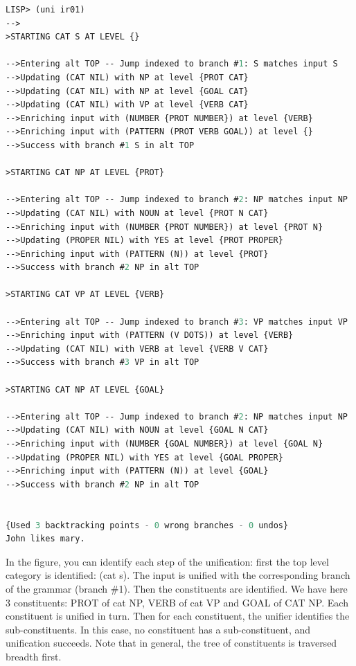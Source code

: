 \documentclass[10pt,a4paper]{report}
\begin{document}
\begin{lstlisting}[language=Lisp]
LISP> (uni ir01)
-->
>STARTING CAT S AT LEVEL {}

-->Entering alt TOP -- Jump indexed to branch #1: S matches input S
-->Updating (CAT NIL) with NP at level {PROT CAT}
-->Updating (CAT NIL) with NP at level {GOAL CAT}
-->Updating (CAT NIL) with VP at level {VERB CAT}
-->Enriching input with (NUMBER {PROT NUMBER}) at level {VERB}
-->Enriching input with (PATTERN (PROT VERB GOAL)) at level {}
-->Success with branch #1 S in alt TOP

>STARTING CAT NP AT LEVEL {PROT}

-->Entering alt TOP -- Jump indexed to branch #2: NP matches input NP
-->Updating (CAT NIL) with NOUN at level {PROT N CAT}
-->Enriching input with (NUMBER {PROT NUMBER}) at level {PROT N}
-->Updating (PROPER NIL) with YES at level {PROT PROPER}
-->Enriching input with (PATTERN (N)) at level {PROT}
-->Success with branch #2 NP in alt TOP

>STARTING CAT VP AT LEVEL {VERB}

-->Entering alt TOP -- Jump indexed to branch #3: VP matches input VP
-->Enriching input with (PATTERN (V DOTS)) at level {VERB}
-->Updating (CAT NIL) with VERB at level {VERB V CAT}
-->Success with branch #3 VP in alt TOP

>STARTING CAT NP AT LEVEL {GOAL}

-->Entering alt TOP -- Jump indexed to branch #2: NP matches input NP
-->Updating (CAT NIL) with NOUN at level {GOAL N CAT}
-->Enriching input with (NUMBER {GOAL NUMBER}) at level {GOAL N}
-->Updating (PROPER NIL) with YES at level {GOAL PROPER}
-->Enriching input with (PATTERN (N)) at level {GOAL}
-->Success with branch #2 NP in alt TOP


{Used 3 backtracking points - 0 wrong branches - 0 undos}
John likes mary.
\end{lstlisting}

In the figure, you can identify each step of the unification:  first the
top level category is identified: (cat s).  The input is unified with the
corresponding branch of the grammar (branch \#1).  Then the constituents are
identified.  We have here 3 constituents: PROT of cat NP, VERB of cat VP
and GOAL of CAT NP.  Each constituent is unified in turn.  Then for each
constituent, the unifier identifies the sub-constituents.  In this case, no
constituent has a sub-constituent, and unification succeeds.  Note that in
general, the tree of constituents is traversed breadth first.
\end{document}
